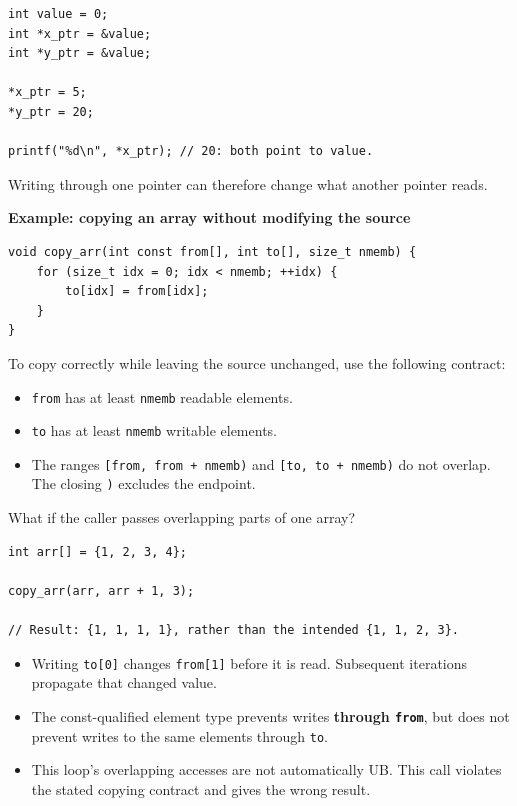 \documentclass[11pt,a4paper]{article}
\begin{document}
\begin{lstlisting}[style=cscode]
int value = 0;
int *x_ptr = &value;
int *y_ptr = &value;

*x_ptr = 5;
*y_ptr = 20;

printf("%d\n", *x_ptr); // 20: both point to value.
\end{lstlisting}

Writing through one pointer can therefore change what another
pointer reads.

\textbf{Example: copying an array without modifying the source}

\begin{lstlisting}[style=cscode]
void copy_arr(int const from[], int to[], size_t nmemb) {
    for (size_t idx = 0; idx < nmemb; ++idx) {
        to[idx] = from[idx];
    }
}
\end{lstlisting}

To copy correctly while leaving the source unchanged, use the
following contract:

\begin{itemize}
    \item \texttt{from} has at least \texttt{nmemb} readable elements.
    \item \texttt{to} has at least \texttt{nmemb} writable elements.
    \item The ranges
          \texttt{[from, from + nmemb)} and
          \texttt{[to, to + nmemb)} do not overlap.
          The closing \texttt{)} excludes the endpoint.
\end{itemize}

What if the caller passes overlapping parts of one array?

\begin{lstlisting}[style=cscode]
int arr[] = {1, 2, 3, 4};

copy_arr(arr, arr + 1, 3);

// Result: {1, 1, 1, 1}, rather than the intended {1, 1, 2, 3}.
\end{lstlisting}

\begin{itemize}
    \item Writing \texttt{to[0]} changes \texttt{from[1]} before
          it is read. Subsequent iterations propagate that
          changed value.
    \item The const-qualified element type prevents writes
          \textbf{through \texttt{from}}, but does not prevent
          writes to the same elements through \texttt{to}.
    \item This loop's overlapping accesses are not automatically
          UB. This call violates the stated copying contract
          and gives the wrong result.
\end{itemize}
\end{document}

